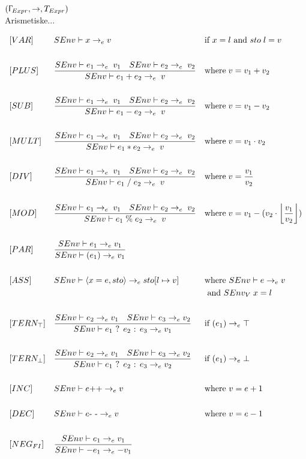 $ (\Upgamma_{Expr}, \rightarrow, T_{Expr}) $\\

\noindent Arismetiske...

\begin{align*}
&[VAR] & &SEnv \vdash x \rightarrow_e v & &\text{if } x = l \text{ and } sto\; l = v\\\\
&[PLUS] & &\frac{SEnv \vdash e_1 \rightarrow_e\; v_1\quad SEnv \vdash e_2 \rightarrow_e\; v_2}{SEnv \vdash e_1 + e_2 \rightarrow_e\; v} & &\text{where}\; v = v_1 + v_2\\\\
&[SUB] & &\frac{SEnv \vdash e_1 \rightarrow_e\; v_1\quad SEnv \vdash e_2 \rightarrow_e\; v_2}{SEnv \vdash e_1 - e_2 \rightarrow_e\; v} & &\text{where}\; v = v_1 - v_2\\\\
&[MULT] & &\frac{SEnv \vdash e_1 \rightarrow_e\; v_1\quad SEnv \vdash e_2 \rightarrow_e\; v_2}{SEnv \vdash e_1 * e_2 \rightarrow_e\; v} & &\text{where}\; v = v_1 \cdot v_2\\\\
&[DIV] & &\frac{SEnv \vdash e_1 \rightarrow_e\; v_1\quad SEnv \vdash e_2 \rightarrow_e\; v_2}{SEnv \vdash e_1\; /\; e_2 \rightarrow_e\; v} & &\text{where}\; v = \frac{v_1}{v_2}\\\\
&[MOD] & &\frac{SEnv \vdash e_1 \rightarrow_e\; v_1\quad SEnv \vdash e_2 \rightarrow_e\; v_2}{SEnv \vdash e_1\; \%\; e_2 \rightarrow_e\; v} & &\text{where}\; v = v_1 - (v_2 \cdot \floor*{\frac{v_1}{v_2}})\\\\
&[PAR] & &\frac{SEnv \vdash e_1 \rightarrow_e v_1}{SEnv \vdash (e_1) \rightarrow_e v_1}\\\\
&[ASS] & &SEnv \vdash \langle x = e, sto \rangle \rightarrow_e sto[l \mapsto v] & &\text{where } SEnv \vdash e \rightarrow_e v\\
& & & & &\text{ and } SEnv_V\; x = l\\\\
&[TERN_\top] & &\frac{SEnv \vdash e_2 \rightarrow_e v_1\quad SEnv \vdash e_3 \rightarrow_e v_2}{SEnv \vdash e_1 \text{ ? } e_2 \text{ : } e_3 \rightarrow_e v_1} & &\text{if } (e_1) \rightarrow_e \top\\\\
&[TERN_\bot] & &\frac{SEnv \vdash e_2 \rightarrow_e v_1\quad SEnv \vdash e_3 \rightarrow_e v_2}{SEnv \vdash e_1 \text{ ? } e_2 \text{ : } e_3 \rightarrow_e v_2} & &\text{if } (e_1) \rightarrow_e \bot\\\\
&[INC] & &SEnv \vdash e \text{++} \rightarrow_e v& &\text{where } v = e + 1\\\\
&[DEC] & &SEnv \vdash e \text{- -} \rightarrow_e v& &\text{where } v = e - 1\\\\
&[NEG_{FI}] & &\frac{SEnv \vdash e_1 \rightarrow_e v_1}{SEnv \vdash -e_1 \rightarrow_e -v_1}  & &\\\\
\end{align*}

